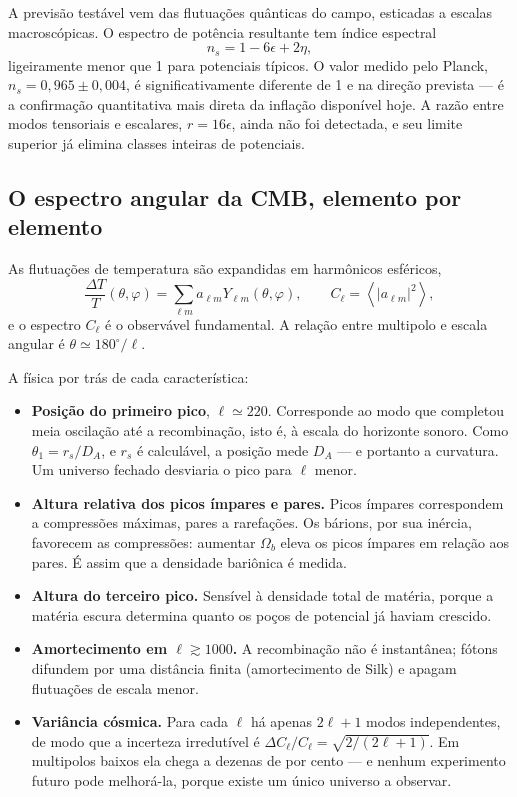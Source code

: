 \documentclass[11pt,a4paper]{article}
\begin{document}
A previsão testável vem das flutuações quânticas do campo, esticadas a escalas macroscópicas. O espectro de potência resultante tem índice espectral
\[
n_s=1-6\epsilon+2\eta,
\]
ligeiramente menor que 1 para potenciais típicos. O valor medido pelo Planck, $n_s=0{,}965\pm0{,}004$, é significativamente diferente de 1 e na direção prevista --- é a confirmação quantitativa mais direta da inflação disponível hoje. A razão entre modos tensoriais e escalares, $r=16\epsilon$, ainda não foi detectada, e seu limite superior já elimina classes inteiras de potenciais.

\subsection*{O espectro angular da CMB, elemento por elemento}

As flutuações de temperatura são expandidas em harmônicos esféricos,
\[
\frac{\Delta T}{T}(\theta,\varphi)=\sum_{\ell m}a_{\ell m}Y_{\ell m}(\theta,\varphi),
\qquad
C_\ell=\left\langle|a_{\ell m}|^{2}\right\rangle,
\]
e o espectro $C_\ell$ é o observável fundamental. A relação entre multipolo e escala angular é $\theta\simeq180^\circ/\ell$.

A física por trás de cada característica:
\begin{itemize}
\item \textbf{Posição do primeiro pico}, $\ell\simeq220$. Corresponde ao modo que completou meia oscilação até a recombinação, isto é, à escala do horizonte sonoro. Como $\theta_1=r_s/D_A$, e $r_s$ é calculável, a posição mede $D_A$ --- e portanto a curvatura. Um universo fechado desviaria o pico para $\ell$ menor.
\item \textbf{Altura relativa dos picos ímpares e pares.} Picos ímpares correspondem a compressões máximas, pares a rarefações. Os bárions, por sua inércia, favorecem as compressões: aumentar $\Omega_b$ eleva os picos ímpares em relação aos pares. É assim que a densidade bariônica é medida.
\item \textbf{Altura do terceiro pico.} Sensível à densidade total de matéria, porque a matéria escura determina quanto os poços de potencial já haviam crescido.
\item \textbf{Amortecimento em $\ell\gtrsim1000$.} A recombinação não é instantânea; fótons difundem por uma distância finita (amortecimento de Silk) e apagam flutuações de escala menor.
\item \textbf{Variância cósmica.} Para cada $\ell$ há apenas $2\ell+1$ modos independentes, de modo que a incerteza irredutível é $\Delta C_\ell/C_\ell=\sqrt{2/(2\ell+1)}$. Em multipolos baixos ela chega a dezenas de por cento --- e nenhum experimento futuro pode melhorá-la, porque existe um único universo a observar.
\end{itemize}
\end{document}
